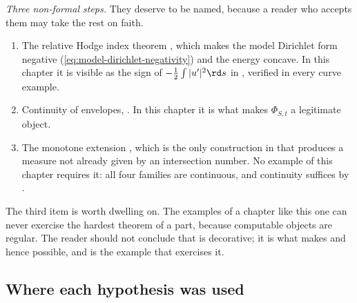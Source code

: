 \emph{Three non-formal steps.}  They deserve to be named, because a reader
who accepts them may take the rest on faith.
\begin{enumerate}
\item\label{itm:ch31-hard:hodge}
 The relative Hodge index theorem , which makes
 the model Dirichlet form negative
 (\eqref{eq:model-dirichlet-negativity}) and the energy concave.  In this
 chapter it is visible as the sign of \(-\tfrac12\int|u'|^2\rd s\) in
 , verified in every curve example.
\item\label{itm:ch31-hard:envelope}
 Continuity of envelopes, .  In this
 chapter it is what makes \(\Phi_{S,t}\) a legitimate object.
\item\label{itm:ch31-hard:monotone}
 The monotone extension , which is the only
 construction in  that produces a measure not already given
 by an intersection number.  No example of this chapter requires it: all
 four families are continuous, and continuity suffices by
 .
\end{enumerate}
The third item is worth dwelling on.  The examples of a chapter like this
one can never exercise the hardest theorem of a part, because computable
objects are regular.  The reader should not conclude that
 is decorative; it is what makes
 and hence 
possible, and  is the example that exercises it.

\subsection{Where each hypothesis was used}
\label{sec:ch31-hypothesis-use}

